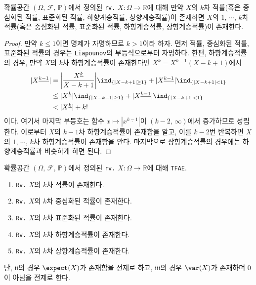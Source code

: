 \begin{proposition}\label{prop:lowerMomentExist}
    확률공간 $(\Omega,\,\mathcal{F},\,\mathbb{P})$에서 정의된 \texttt{rv.} $X:\Omega\to\mathbb{R}$에 대해 만약 $X$의 $k$차 적률(혹은 중심화된 적률, 표준화된 적률, 하향계승적률, 상향계승적률)이 존재하면 $X$의 $1,\,\cdots,\,k$차 적률(혹은 중심화된 적률, 표준화된 적률, 하향계승적률, 상향계승적률)이 존재한다.
\end{proposition}

\begin{proof}
    만약 $k\leq1$이면 명제가 자명하므로 $k>1$이라 하자. 먼저 적률, 중심화된 적률, 표준화된 적률의 경우는 \texttt{Liapounov}의 부등식으로부터 자명하다. 한편, 하향계승적률의 경우, 만약 $X$의 $k$차 하향계승적률이 존재한다면 $X^{\underline{k}}=X^{\underline{k-1}}(X-k+1)$에서
    \begin{align*}
        |X^{\underline{k-1}}|&=\bigg|\frac{X^{\underline{k}}}{X-k+1}\bigg|\ind_{\{|X-k+1|\geq1\}}+|X^{\underline{k-1}}|\ind_{\{|X-k+1|<1\}}\\
        &\leq|X^{\underline{k}}|\ind_{\{|X-k+1|\geq1\}}+|X^{\underline{k-1}}|\ind_{\{|X-k+1|<1\}}\\
        &<|X^{\underline{k}}|+k!
    \end{align*}
    이다. 여기서 마지막 부등호는 함수 $x\mapsto|x^{\underline{k-1}}|$이 $(k-2,\,\infty)$에서 증가하므로 성립한다. 이로부터 $X$의 $k-1$차 하향계승적률이 존재함을 알고, 이를 $k-2$번 반복하면 $X$의 $1,\,\cdots,\,k$차 하향계승적률이 존재함을 안다. 마지막으로 상향계승적률의 경우에는 하향계승적률과 비슷하게 하면 된다.
\end{proof}

\begin{proposition}\label{prop:momentExist}
    확률공간 $(\Omega,\,\mathcal{F},\,\mathbb{P})$에서 정의된 \texttt{rv.} $X:\Omega\to\mathbb{R}$에 대해 \texttt{TFAE}.
    \begin{enumerate}
        \item \texttt{Rv.} $X$의 $k$차 적률이 존재한다.
        \item \texttt{Rv.} $X$의 $k$차 중심화된 적률이 존재한다.
        \item \texttt{Rv.} $X$의 $k$차 표준화된 적률이 존재한다.
        \item \texttt{Rv.} $X$의 $k$차 하향계승적률이 존재한다.
        \item \texttt{Rv.} $X$의 $k$차 상향계승적률이 존재한다.
    \end{enumerate}
    단, ii의 경우 $\expect(X)$가 존재함을 전제로 하고, iii의 경우 $\var(X)$가 존재하며 $0$이 아님을 전제로 한다.
\end{proposition}

